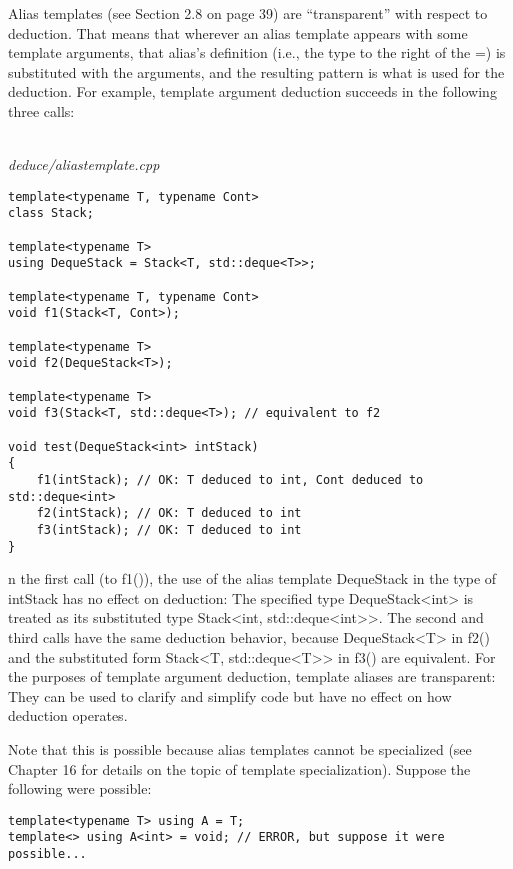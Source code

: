Alias templates (see Section 2.8 on page 39) are “transparent” with respect to deduction. That means that wherever an alias template appears with some template arguments, that alias’s definition (i.e., the type to the right of the =) is substituted with the arguments, and the resulting pattern is what is used for the deduction. For example, template argument deduction succeeds in the following three calls:

\hspace*{\fill} \\ %
\noindent
\textit{deduce/aliastemplate.cpp}
\begin{lstlisting}[style=styleCXX]
template<typename T, typename Cont>
class Stack;

template<typename T>
using DequeStack = Stack<T, std::deque<T>>;

template<typename T, typename Cont>
void f1(Stack<T, Cont>);

template<typename T>
void f2(DequeStack<T>);

template<typename T>
void f3(Stack<T, std::deque<T>); // equivalent to f2

void test(DequeStack<int> intStack)
{
	f1(intStack); // OK: T deduced to int, Cont deduced to std::deque<int>
	f2(intStack); // OK: T deduced to int
	f3(intStack); // OK: T deduced to int
}
\end{lstlisting}

n the first call (to f1()), the use of the alias template DequeStack in the type of intStack has no effect on deduction: The specified type DequeStack<int> is treated as its substituted type Stack<int, std::deque<int>>. The second and third calls have the same deduction behavior, because DequeStack<T> in f2() and the substituted form Stack<T, std::deque<T>> in f3() are equivalent. For the purposes of template argument deduction, template aliases are transparent: They can be used to clarify and simplify code but have no effect on how deduction operates.

Note that this is possible because alias templates cannot be specialized (see Chapter 16 for details on the topic of template specialization). Suppose the following were possible:

\begin{lstlisting}[style=styleCXX]
template<typename T> using A = T;
template<> using A<int> = void; // ERROR, but suppose it were possible...
\end{lstlisting}

